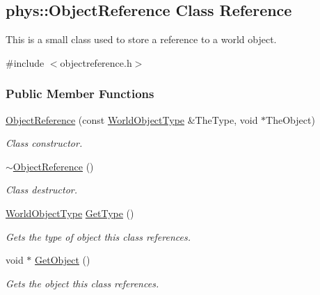 \hypertarget{classphys_1_1ObjectReference}{
\subsection{phys::ObjectReference Class Reference}
\label{d6/d54/classphys_1_1ObjectReference}
}


This is a small class used to store a reference to a world object.  




{\ttfamily \#include $<$objectreference.h$>$}

\subsubsection*{Public Member Functions}
\begin{DoxyCompactItemize}
\item 
\hyperlink{classphys_1_1ObjectReference_aa97733aef863b81f9fdbb4455d60d7e9}{ObjectReference} (const \hyperlink{namespacephys_a56410935e1c614a932dbc91ee7330df1}{WorldObjectType} \&TheType, void $\ast$TheObject)
\begin{DoxyCompactList}\small\item\em Class constructor. \item\end{DoxyCompactList}\item 
\hypertarget{classphys_1_1ObjectReference_ae0205396bc65406316730a6cd5bdc237}{
\hyperlink{classphys_1_1ObjectReference_ae0205396bc65406316730a6cd5bdc237}{$\sim$ObjectReference} ()}
\label{d6/d54/classphys_1_1ObjectReference_ae0205396bc65406316730a6cd5bdc237}

\begin{DoxyCompactList}\small\item\em Class destructor. \item\end{DoxyCompactList}\item 
\hyperlink{namespacephys_a56410935e1c614a932dbc91ee7330df1}{WorldObjectType} \hyperlink{classphys_1_1ObjectReference_aea70ac457331e5b20a7487e2d93ba005}{GetType} ()
\begin{DoxyCompactList}\small\item\em Gets the type of object this class references. \item\end{DoxyCompactList}\item 
void $\ast$ \hyperlink{classphys_1_1ObjectReference_a729c6e6b0ec5f0bbc7eb19987235729e}{GetObject} ()
\begin{DoxyCompactList}\small\item\em Gets the object this class references. \item\end{DoxyCompactList}\end{DoxyCompactItemize}
